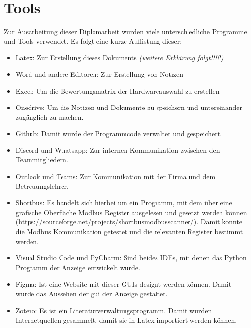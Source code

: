 \ifoot{\leftmark}
\chapter{Tools}
Zur Ausarbeitung dieser Diplomarbeit wurden viele unterschiedliche Programme und Tools verwendet. Es folgt eine kurze Auflistung dieser:
\begin{itemize}
	\item Latex: Zur Erstellung dieses Dokuments \textit{(weitere Erklärung folgt!!!!!)}
	\item Word und andere Editoren: Zur Erstellung von Notizen
	\item Excel: Um die Bewertungsmatrix der Hardwareauswahl zu erstellen
	\item Onedrive: Um die Notizen und Dokumente zu speichern und untereinander zugänglich zu machen.
	\item Github: Damit wurde der Programmcode verwaltet und gespeichert.
	\item Discord und Whatsapp: Zur internen Kommunikation zwischen den Teammitgliedern.
	\item Outlook und Teams: Zur Kommunikation mit der Firma und dem Betreuungslehrer.
	\item Shortbus: Es handelt sich hierbei um ein Programm, mit dem über eine grafische Oberfläche Modbus Register ausgelesen und gesetzt werden können (https://sourceforge.net/projects/shortbusmodbusscanner/). Damit konnte die Modbus Kommunikation getestet und die relevanten Register bestimmt werden.
	\item Visual Studio Code und PyCharm: Sind beides IDEs, mit denen das Python Programm der Anzeige entwickelt wurde.
	\item Figma: Ist eine Website mit dieser GUIs designt werden können. Damit wurde das Aussehen der \acs{gui} der Anzeige gestaltet.
	\item Zotero: Es ist ein Literaturverwaltungsprogramm. Damit wurden Internetquellen gesammelt, damit sie in Latex importiert werden können.
\end{itemize}

